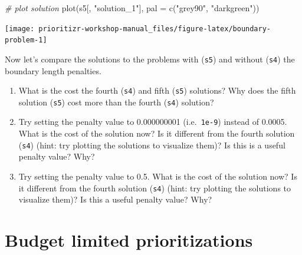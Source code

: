 \documentclass[
  12pt,
]{book}
\makeatletter
\newenvironment{Shaded}{\begin{snugshade}}{\end{snugshade}}
\newcommand{\AttributeTok}[1]{\textcolor[rgb]{0.77,0.63,0.00}{#1}}
\newcommand{\CommentTok}[1]{\textcolor[rgb]{0.56,0.35,0.01}{\textit{#1}}}
\newcommand{\FunctionTok}[1]{\textcolor[rgb]{0.00,0.00,0.00}{#1}}
\newcommand{\NormalTok}[1]{#1}
\newcommand{\StringTok}[1]{\textcolor[rgb]{0.31,0.60,0.02}{#1}}
\providecommand{\tightlist}{%
  \setlength{\itemsep}{0pt}\setlength{\parskip}{0pt}}
\newenvironment{kframe}{%
\medskip{}
\setlength{\fboxsep}{.8em}
 \def\at@end@of@kframe{}%
 \ifinner\ifhmode%
  \def\at@end@of@kframe{\end{minipage}}%
  \begin{minipage}{\columnwidth}%
 \fi\fi%
 \def\FrameCommand##1{\hskip\@totalleftmargin \hskip-\fboxsep
 \colorbox{shadecolor}{##1}\hskip-\fboxsep
     \hskip-\linewidth \hskip-\@totalleftmargin \hskip\columnwidth}%
 \MakeFramed {\advance\hsize-\width
   \@totalleftmargin\z@ \linewidth\hsize
   \@setminipage}}%
 {\par\unskip\endMakeFramed%
 \at@end@of@kframe}
\newenvironment{rmdblock}[1]
  {
  \begin{itemize}
  \renewcommand{\labelitemi}{
    \raisebox{-.7\height}[0pt][0pt]{
      {\setkeys{Gin}{width=3em,keepaspectratio}\texttt{[image: images/\#1]}}
    }
  }
  \setlength{\fboxsep}{1em}
  \begin{kframe}
  \item
  }
  {
  \end{kframe}
  \end{itemize}
  }
\newenvironment{rmdquestion}
  {\begin{rmdblock}{question}}
  {\end{rmdblock}}
\makeatother
\begin{document}
\begin{Shaded}
\begin{Highlighting}[]
\CommentTok{\# plot solution}
\FunctionTok{plot}\NormalTok{(s5[, }\StringTok{"solution\_1"}\NormalTok{], }\AttributeTok{pal =} \FunctionTok{c}\NormalTok{(}\StringTok{"grey90"}\NormalTok{, }\StringTok{"darkgreen"}\NormalTok{))}
\end{Highlighting}
\end{Shaded}

\begin{center}\texttt{[image: prioritizr-workshop-manual\_files/figure-latex/boundary-problem-1]} \end{center}

Now let's compare the solutions to the problems with (\texttt{s5}) and without (\texttt{s4}) the boundary length penalties.

\begin{rmdquestion}
\begin{enumerate}
\def\labelenumi{\arabic{enumi}.}
\tightlist
\item
  What is the cost the fourth (\texttt{s4}) and fifth (\texttt{s5}) solutions? Why does the fifth solution (\texttt{s5}) cost more than the fourth (\texttt{s4}) solution?
\item
  Try setting the penalty value to 0.000000001 (i.e.~\texttt{1e-9}) instead of 0.0005. What is the cost of the solution now? Is it different from the fourth solution (\texttt{s4}) (hint: try plotting the solutions to visualize them)? Is this is a useful penalty value? Why?
\item
  Try setting the penalty value to 0.5. What is the cost of the solution now? Is it different from the fourth solution (\texttt{s4}) (hint: try plotting the solutions to visualize them)? Is this a useful penalty value? Why?
\end{enumerate}
\end{rmdquestion}

\hypertarget{budget-limited-prioritizations}{%
\section{Budget limited prioritizations}\label{budget-limited-prioritizations}}
\end{document}
